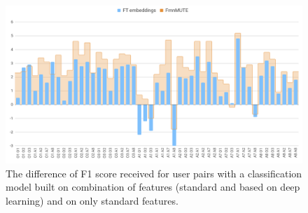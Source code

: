 \begin{figure}[h]
    \centering
    \includegraphics[width=15cm]{Images/f1-diff-frnnmute-ft.png}
    \caption{The difference of F1 score received for user pairs with a classification model built on combination of features (standard and based on deep learning) and on only standard features. }
    \label{fig:f1-diff-frnnmute-ft}
\end{figure} 

